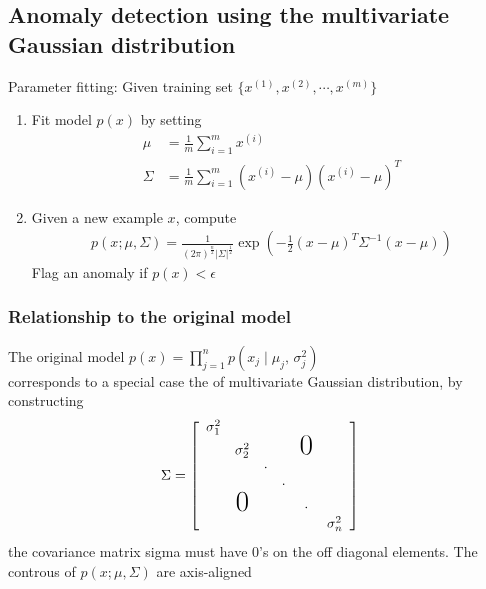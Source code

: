 %
\subsection{Anomaly detection using the multivariate Gaussian distribution}
Parameter fitting:
Given training set $\{x^{(1)}, x^{(2)}, \cdots, x^{(m)}\}$
\begin{enumerate}
\item
    Fit model $p(x)$ by setting
    \begin{align*}
    \mu &= \frac{1}{m}\sum_{i=1}^mx^{(i)}\\
    \Sigma &= \frac{1}{m}\sum_{i=1}^m(x^{(i)} - \mu)(x^{(i)} - \mu)^T
    \end{align*}
\item
    Given a new example $x$, compute\\
    \begin{align*}
    p(x; \mu, \Sigma) =  \frac{1}{(2\pi)^{\frac{n}{2}}|\Sigma|^{\frac{1}{2}}}\exp{(-\frac{1}{2}(x-\mu)^T\Sigma^{-1}(x-\mu))}
    \end{align*}
    Flag an anomaly if $p(x)<\epsilon$
\end{enumerate}

\subsubsection{Relationship to the original model}
The original model $p(x)= \prod_{j=1}^np(x_j\mid \mu_j,\,\sigma^{2}_j)$\\
corresponds to a special case the of multivariate Gaussian distribution, by constructing
\begin{align*}
\Sigma = \left[
    \begin{array}{cccccc}
       \sigma_1^2                                  \\
      & \sigma_2^2 & & & \text{\huge0}\\
      &               & \cdot             		\\
      &       &        & \cdot                      \\
      & \text{\huge0} &  & & \cdot         \\
      &  &   &  &  & \sigma_n^2
    \end{array}
    \right]
\end{align*}
the covariance matrix sigma must have 0's on the off diagonal elements. The controus of $p(x; \mu, \Sigma)$ are axis-aligned\\


